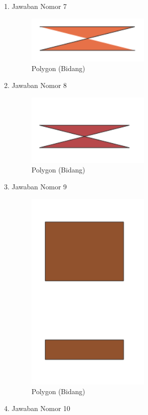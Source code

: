 \begin{enumerate}
	\item Jawaban Nomor 7
	
	\begin{figure}[H]
		\includegraphics[width=6cm]{figures/Tugas2/1174067/7.png}
		\centering
		\caption{Polygon (Bidang)}
	\end{figure}
	\item Jawaban Nomor 8
	
	\begin{figure}[H]
		\includegraphics[width=6cm]{figures/Tugas2/1174067/8.png}
		\centering
		\caption{Polygon (Bidang)}
	\end{figure}
	\item Jawaban Nomor 9
	
	\begin{figure}[H]
		\includegraphics[width=6cm]{figures/Tugas2/1174067/9.png}
		\centering
		\caption{Polygon (Bidang)}
	\end{figure}
	\item Jawaban Nomor 10

\end{enumerate}
